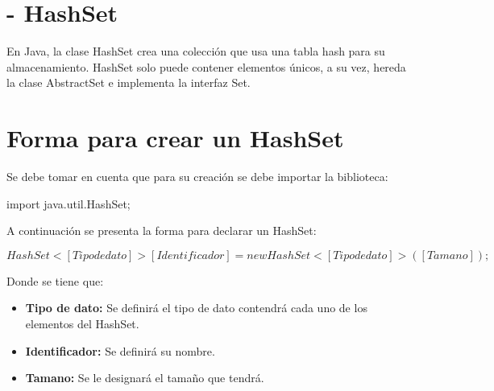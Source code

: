 \documentclass[12pt, letterpaper]{article} %
\begin{document}
\section*{- HashSet}
En Java, la clase HashSet crea una colección que usa una tabla hash para su almacenamiento. HashSet solo puede contener elementos únicos, a su vez, hereda la clase AbstractSet e implementa la interfaz Set.

\section*{Forma para crear un HashSet}
Se debe tomar en cuenta que para su creación se debe importar la biblioteca:
\begin{center}
    import java.util.HashSet;
\end{center}
A continuación se presenta la forma para declarar un HashSet:
\begin{center}
   $HashSet<[Tipo de dato]> [Identificador] = new HashSet<[Tipo de dato]>([Tamano]);$ 
\end{center}
Donde se tiene que:
\begin{itemize}
    \item \textbf{Tipo de dato:} Se definirá el tipo de dato contendrá cada uno de los elementos del HashSet.
    \item \textbf{Identificador:} Se definirá su nombre.
    \item \textbf{Tamano:} Se le designará el tamaño que tendrá.
\end{itemize}
\end{document}
